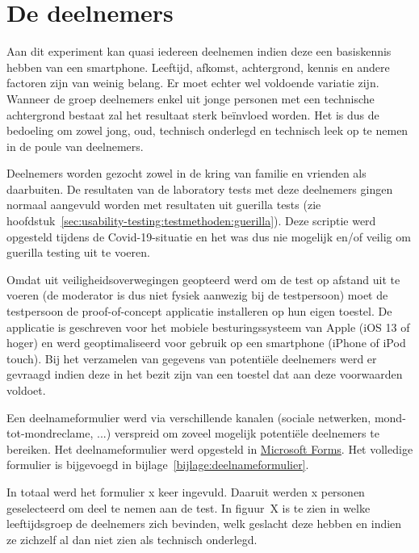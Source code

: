 \section{De deelnemers}
\label{sec:deelnemers}

Aan dit experiment kan quasi iedereen deelnemen indien deze een basiskennis hebben van een smartphone. Leeftijd, afkomst, achtergrond, kennis en andere factoren zijn van weinig belang. Er moet echter wel voldoende variatie zijn. Wanneer de groep deelnemers enkel uit jonge personen met een technische achtergrond bestaat zal het resultaat sterk beïnvloed worden. Het is dus de bedoeling om zowel jong, oud, technisch onderlegd en technisch leek op te nemen in de poule van deelnemers.

Deelnemers worden gezocht zowel in de kring van familie en vrienden als daarbuiten. De resultaten van de laboratory tests met deze deelnemers gingen normaal aangevuld worden met resultaten uit guerilla tests (zie hoofdstuk~\ref{sec:usability-testing:testmethoden:guerilla}). Deze scriptie werd opgesteld tijdens de Covid-19-situatie en het was dus nie mogelijk en/of veilig om guerilla testing uit te voeren.

Omdat uit veiligheidsoverwegingen geopteerd werd om de test op afstand uit te voeren (de moderator is dus niet fysiek aanwezig bij de testpersoon) moet de testpersoon de proof-of-concept applicatie installeren op hun eigen toestel. De applicatie is geschreven voor het mobiele besturingssysteem van Apple (iOS 13 of hoger) en werd geoptimaliseerd voor gebruik op een smartphone (iPhone of iPod touch). Bij het verzamelen van gegevens van potentiële deelnemers werd er gevraagd indien deze in het bezit zijn van een toestel dat aan deze voorwaarden voldoet.

Een deelnameformulier werd via verschillende kanalen (sociale netwerken, mond-tot-mondreclame, ...) verspreid om zoveel mogelijk potentiële deelnemers te bereiken. Het deelnameformulier werd opgesteld in \href{https://forms.office.com/}{Microsoft Forms}. Het volledige formulier is bijgevoegd in bijlage~\ref{bijlage:deelnameformulier}.

In totaal werd het formulier x keer ingevuld. Daaruit werden x personen geselecteerd om deel te nemen aan de test. In figuur~X is te zien in welke leeftijdsgroep de deelnemers zich bevinden, welk geslacht deze hebben en indien ze zichzelf al dan niet zien als technisch onderlegd.

